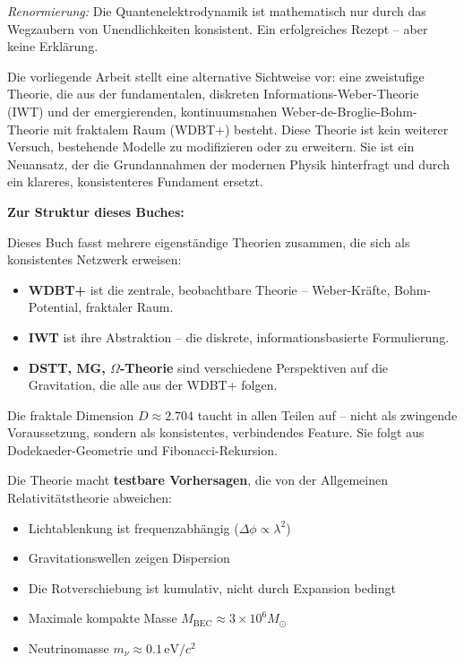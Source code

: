 \documentclass[11pt,a4paper]{book}
\begin{document}
\noindent
\textit{Renormierung:} Die Quantenelektrodynamik ist mathematisch nur durch das Wegzaubern von Unendlichkeiten konsistent. Ein erfolgreiches Rezept – aber
keine Erklärung.

\vspace{0.3cm}

Die vorliegende Arbeit stellt eine alternative Sichtweise vor: eine zweistufige Theorie, die aus der fundamentalen, diskreten
Informations-Weber-Theorie (IWT) und der emergierenden, kontinuumsnahen Weber-de-Broglie-Bohm-Theorie mit fraktalem Raum (WDBT+) besteht. Diese Theorie ist
kein weiterer Versuch, bestehende Modelle zu modifizieren oder zu erweitern. Sie ist ein Neuansatz, der die Grundannahmen der modernen Physik hinterfragt
und durch ein klareres, konsistenteres Fundament ersetzt.

\vspace{0.3cm}
\noindent
\textbf{Zur Struktur dieses Buches:}
\vspace{0.1cm}

Dieses Buch fasst mehrere eigenständige Theorien zusammen, die sich als konsistentes Netzwerk erweisen:

\begin{itemize}
    \item \textbf{WDBT+} ist die zentrale, beobachtbare Theorie – Weber-Kräfte, Bohm-Potential, fraktaler Raum.
    \item \textbf{IWT} ist ihre Abstraktion – die diskrete, informationsbasierte Formulierung.
    \item \textbf{DSTT, MG, $\Omega$-Theorie} sind verschiedene Perspektiven auf die Gravitation, die alle aus der WDBT+ folgen.
\end{itemize}

Die fraktale Dimension $D \approx 2.704$ taucht in allen Teilen auf – nicht als zwingende Voraussetzung, sondern als konsistentes, verbindendes Feature.
Sie folgt aus Dodekaeder-Geometrie und Fibonacci-Rekursion.

Die Theorie macht \textbf{testbare Vorhersagen}, die von der Allgemeinen Relativitätstheorie abweichen:
\begin{itemize}
    \item Lichtablenkung ist frequenzabhängig ($\Delta\phi \propto \lambda^2$)
    \item Gravitationswellen zeigen Dispersion
    \item Die Rotverschiebung ist kumulativ, nicht durch Expansion bedingt
    \item Maximale kompakte Masse $M_{\text{BEC}} \approx 3 \times 10^6 M_\odot$
    \item Neutrinomasse $m_\nu \approx 0.1\,\text{eV}/c^2$
\end{itemize}
\end{document}
